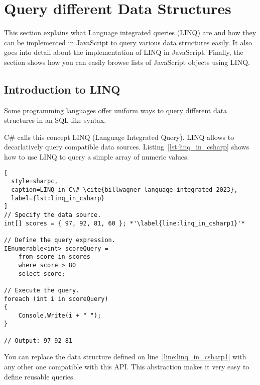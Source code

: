 \section{Query different Data Structures}
This section explains what Language integrated queries (LINQ) are and how they
can be implemented in JavaScript to query various data structures easily. It
also goes into detail about the implementation of LINQ in JavaScript. Finally,
the section shows how you can easily browse lists of JavaScript objects using
LINQ.
\subsection{Introduction to LINQ} %
Some programming languages offer uniform ways to query different data
structures in an SQL-like syntax.

C\# calls this concept LINQ (Language Integrated Query). LINQ allows to
decarlatively query compatible data sources. Listing~\ref{lst:linq_in_csharp}
shows how to use LINQ to query a simple array of numeric values.

\begin{lstlisting}[
  style=sharpc,
  caption=LINQ in C\# \cite{billwagner_language-integrated_2023},
  label={lst:linq_in_csharp}
]
// Specify the data source.
int[] scores = { 97, 92, 81, 60 }; *'\label{line:linq_in_csharp1}'*

// Define the query expression.
IEnumerable<int> scoreQuery =
    from score in scores
    where score > 80
    select score;

// Execute the query.
foreach (int i in scoreQuery)
{
    Console.Write(i + " ");
}

// Output: 97 92 81
\end{lstlisting}

You can replace the data structure defined on line~\ref{line:linq_in_csharp1}
with any other one compatible with this API. This abstraction makes it very
easy to define reusable queries.

\label{sub:Introduction to LINQ}


